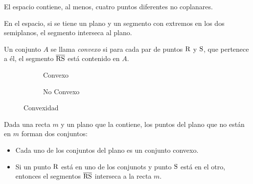 \begin{postulate}
El espacio contiene, al menos, cuatro puntos diferentes no coplanares.
\end{postulate}

\begin{postulate}
    En el espacio, si se tiene un plano y un segmento con extremos en los dos semiplanos, el segmento interseca al plano.
\end{postulate}

\begin{definition}
    Un conjunto $A$ se llama \textit{convexo} si para cada par de puntos $\rm R$ y $\rm S$, que pertenece a él, el segmento $\overline{\rm RS}$ está contenido en $A$.

    \begin{figure}[h!]

        \centering

        \begin{subfigure}[b]{.5\textwidth}
            \centering
            
            \label{fig:conjunto-convexo}
            \caption{Convexo}            
        \end{subfigure}%
        \begin{subfigure}[b]{.5\textwidth}
            \centering
            
            \label{fig:conjunto-no-convexo}
            \caption{No Convexo}            
        \end{subfigure}
        
        \centering
        \caption{Convexidad}
        \label{fig:convexidad}
    
    \end{figure}
    
\end{definition}

\begin{postulate}
    Dada una recta $m$ y un plano que la contiene, los puntos del plano que no están en $m$ forman dos conjuntos:

    \begin{itemize}
        \item Cada uno de los conjuntos del plano es un conjunto convexo.
        \item Si un punto $\rm R$ está en uno de los conjunots y punto $\rm S$ está en el otro, entonces el segmentos $\overline{\rm RS}$ interseca a la recta $m$.
    \end{itemize}
\end{postulate}

